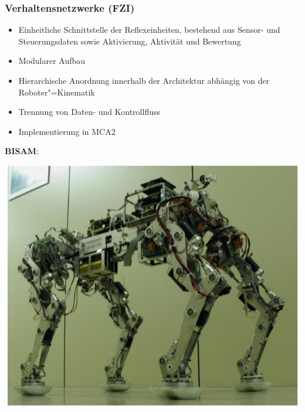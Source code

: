 \subsubsection{Verhaltensnetzwerke (FZI)}
\begin{itemize}
	\item Einheitliche Schnittstelle der Reflexeinheiten, bestehend aus Sensor- und Steuerungsdaten sowie Aktivierung, Aktivität und Bewertung
	\item Modularer Aufbau
	\item Hierarchische Anordnung innerhalb der Architektur abhängig von der Roboter"=Kinematik
	\item Trennung von Daten- und Kontrollfluss
	\item Implementierung in MCA2
\end{itemize}

\textbf{BISAM}:\\
\begin{center}
\includegraphics[width=.3\textwidth]{figures/bisam.png}
\end{center}

